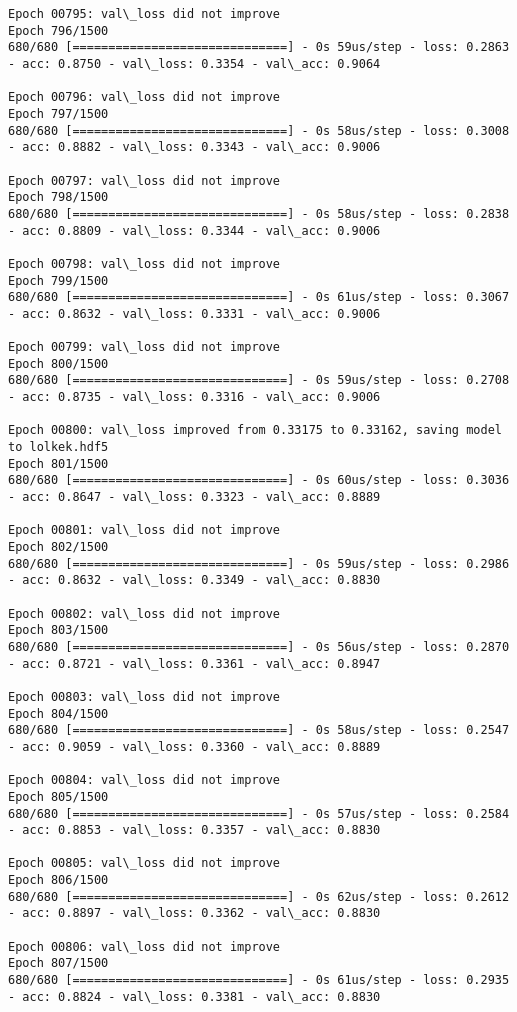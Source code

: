 \documentclass[11pt]{article}
\begin{document}
\begin{Verbatim}[commandchars=\\\{\}]
Epoch 00795: val\_loss did not improve
Epoch 796/1500
680/680 [==============================] - 0s 59us/step - loss: 0.2863 - acc: 0.8750 - val\_loss: 0.3354 - val\_acc: 0.9064

Epoch 00796: val\_loss did not improve
Epoch 797/1500
680/680 [==============================] - 0s 58us/step - loss: 0.3008 - acc: 0.8882 - val\_loss: 0.3343 - val\_acc: 0.9006

Epoch 00797: val\_loss did not improve
Epoch 798/1500
680/680 [==============================] - 0s 58us/step - loss: 0.2838 - acc: 0.8809 - val\_loss: 0.3344 - val\_acc: 0.9006

Epoch 00798: val\_loss did not improve
Epoch 799/1500
680/680 [==============================] - 0s 61us/step - loss: 0.3067 - acc: 0.8632 - val\_loss: 0.3331 - val\_acc: 0.9006

Epoch 00799: val\_loss did not improve
Epoch 800/1500
680/680 [==============================] - 0s 59us/step - loss: 0.2708 - acc: 0.8735 - val\_loss: 0.3316 - val\_acc: 0.9006

Epoch 00800: val\_loss improved from 0.33175 to 0.33162, saving model to lolkek.hdf5
Epoch 801/1500
680/680 [==============================] - 0s 60us/step - loss: 0.3036 - acc: 0.8647 - val\_loss: 0.3323 - val\_acc: 0.8889

Epoch 00801: val\_loss did not improve
Epoch 802/1500
680/680 [==============================] - 0s 59us/step - loss: 0.2986 - acc: 0.8632 - val\_loss: 0.3349 - val\_acc: 0.8830

Epoch 00802: val\_loss did not improve
Epoch 803/1500
680/680 [==============================] - 0s 56us/step - loss: 0.2870 - acc: 0.8721 - val\_loss: 0.3361 - val\_acc: 0.8947

Epoch 00803: val\_loss did not improve
Epoch 804/1500
680/680 [==============================] - 0s 58us/step - loss: 0.2547 - acc: 0.9059 - val\_loss: 0.3360 - val\_acc: 0.8889

Epoch 00804: val\_loss did not improve
Epoch 805/1500
680/680 [==============================] - 0s 57us/step - loss: 0.2584 - acc: 0.8853 - val\_loss: 0.3357 - val\_acc: 0.8830

Epoch 00805: val\_loss did not improve
Epoch 806/1500
680/680 [==============================] - 0s 62us/step - loss: 0.2612 - acc: 0.8897 - val\_loss: 0.3362 - val\_acc: 0.8830

Epoch 00806: val\_loss did not improve
Epoch 807/1500
680/680 [==============================] - 0s 61us/step - loss: 0.2935 - acc: 0.8824 - val\_loss: 0.3381 - val\_acc: 0.8830


\end{Verbatim}
\end{document}
